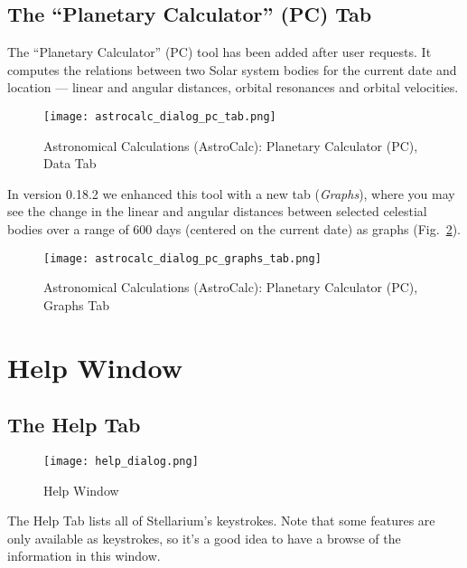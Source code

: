 \subsection{The ``Planetary Calculator'' (PC) Tab}
\label{sec:gui:AstroCalc:PC}

The ``Planetary Calculator'' (PC) tool has been added after user requests. 
It computes the relations between two Solar system bodies for the current date and location --- linear and angular distances, 
orbital resonances and orbital velocities.

\begin{figure}[htbp]
\centering\texttt{[image: astrocalc\_dialog\_pc\_tab.png]}
\caption{Astronomical Calculations (AstroCalc): Planetary Calculator (PC), Data Tab}
\label{fig:gui:AstroCalc:PC:Data}
\end{figure}

In version 0.18.2  we enhanced this tool with a new tab (\emph{Graphs}),
where you may see the change in the linear and angular distances between selected celestial bodies
over a range of 600 days (centered on the current date) as graphs (Fig.~\ref{fig:gui:AstroCalc:PC:Graphs}).

\begin{figure}[htbp]
\centering\texttt{[image: astrocalc\_dialog\_pc\_graphs\_tab.png]}
\caption{Astronomical Calculations (AstroCalc): Planetary Calculator (PC), Graphs Tab}
\label{fig:gui:AstroCalc:PC:Graphs}
\end{figure}


\newpage 
   
\section{Help Window}
\label{sec:gui:help}

\subsection{The Help Tab}
\label{sec:gui:help:help}
\begin{figure}[htbp]
\centering\texttt{[image: help\_dialog.png]}
\caption{Help Window}
\label{fig:gui:help}
\end{figure}

\noindent The Help Tab lists all of Stellarium's keystrokes. Note that some
features are only available as keystrokes, so it's a good idea to have
a browse of the information in this window.


